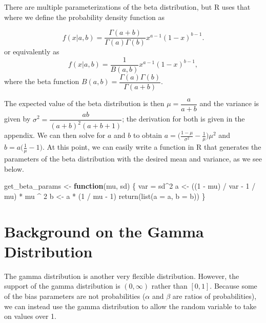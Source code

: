 \documentclass[12pt,twoside]{smiththesis}
\newenvironment{Shaded}{\begin{snugshade}}{\end{snugshade}}
\newcommand{\AttributeTok}[1]{\textcolor[rgb]{0.77,0.63,0.00}{#1}}
\newcommand{\ControlFlowTok}[1]{\textcolor[rgb]{0.13,0.29,0.53}{\textbf{#1}}}
\newcommand{\DecValTok}[1]{\textcolor[rgb]{0.00,0.00,0.81}{#1}}
\newcommand{\FunctionTok}[1]{\textcolor[rgb]{0.00,0.00,0.00}{#1}}
\newcommand{\NormalTok}[1]{#1}
\newcommand{\OtherTok}[1]{\textcolor[rgb]{0.56,0.35,0.01}{#1}}
\newcommand{\SpecialCharTok}[1]{\textcolor[rgb]{0.00,0.00,0.00}{#1}}
\begin{document}
There are multiple parameterizations of the beta distribution, but R uses that where we define the probability density function as

\[
f(x|a,b) = \dfrac{\Gamma(a + b)}{\Gamma(a) \Gamma(b)} x^{a - 1} (1-x)^{b - 1}.
\]
or equivalently as
\[
f(x|a,b) = \dfrac{1}{B(a,b)} x^{a - 1} (1-x)^{b - 1},
\]
where the beta function \(B(a, b) = \dfrac{\Gamma(a)\Gamma(b) }{\Gamma ( a + b)}\).

The expected value of the beta distribution is then \(\mu= \dfrac{a}{a + b}\) and the variance is given by \(\sigma^2 = \dfrac{a b}{(a + b)^2(a +b + 1)}\); the derivation for both is given in the appendix. We can then solve for \(a\) and \(b\) to obtain \(a = \Big(\frac{1-\mu}{\sigma^2} - \frac{1}{\mu}\Big) \mu^2\) and \(b = a\Big(\frac{1}{\mu} - 1\Big)\). At this point, we can easily write a function in R that generates the parameters of the beta distribution with the desired mean and variance, as we see below.
\begin{Shaded}
\begin{Highlighting}[]
\NormalTok{get\_beta\_params }\OtherTok{\textless{}{-}} \ControlFlowTok{function}\NormalTok{(mu, sd) \{}
\NormalTok{    var }\OtherTok{=}\NormalTok{ sd}\SpecialCharTok{\^{}}\DecValTok{2}
\NormalTok{    a }\OtherTok{\textless{}{-}}\NormalTok{ ((}\DecValTok{1} \SpecialCharTok{{-}}\NormalTok{ mu) }\SpecialCharTok{/}\NormalTok{ var }\SpecialCharTok{{-}} \DecValTok{1} \SpecialCharTok{/}\NormalTok{ mu) }\SpecialCharTok{*}\NormalTok{ mu }\SpecialCharTok{\^{}} \DecValTok{2}
\NormalTok{    b }\OtherTok{\textless{}{-}}\NormalTok{ a }\SpecialCharTok{*}\NormalTok{ (}\DecValTok{1} \SpecialCharTok{/}\NormalTok{ mu }\SpecialCharTok{{-}} \DecValTok{1}\NormalTok{)}
    \FunctionTok{return}\NormalTok{(}\FunctionTok{list}\NormalTok{(}\AttributeTok{a =}\NormalTok{ a,}
                \AttributeTok{b =}\NormalTok{ b))}
\NormalTok{\}}
\end{Highlighting}
\end{Shaded}
\hypertarget{background-on-the-gamma-distribution}{%
\section{Background on the Gamma Distribution}\label{background-on-the-gamma-distribution}}

The gamma distribution is another very flexible distribution. However, the support of the gamma distribution is \((0,\infty)\) rather than \([0,1]\). Because some of the bias parameters are not probabilities (\(\alpha\) and \(\beta\) are ratios of probabilities), we can instead use the gamma distribution to allow the random variable to take on values over 1.
\end{document}
